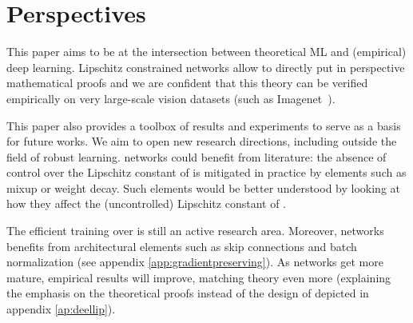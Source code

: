 \vspace{-2mm}
\section{Perspectives}

This paper aims to be at the intersection between theoretical ML and (empirical) deep learning. Lipschitz constrained networks allow to directly put in perspective mathematical proofs and we are confident that this theory can be verified empirically on very large-scale vision datasets (such as Imagenet~\cite{deng09imagenet}).


This paper also provides a toolbox of results and experiments to serve as a basis for future works. We aim to open new research directions, including outside the field of robust learning. \LipInf networks could benefit from \LipCl literature: the absence of control over the Lipschitz constant of \LipInf %
is mitigated in practice by elements such as mixup or weight decay. Such elements would be better understood  by looking at how they affect the (uncontrolled) Lipschitz constant of \LipInf.

The efficient training over \LipCl is still an active research area. Moreover, \LipInf networks benefits from architectural elements such as skip connections and batch normalization (see appendix \ref{app:gradientpreserving}). As \LipCl networks get more mature, empirical results will improve, matching theory even more (explaining the emphasis on the theoretical proofs instead of the design of \LipCl depicted in appendix \ref{ap:deellip}).  
  
